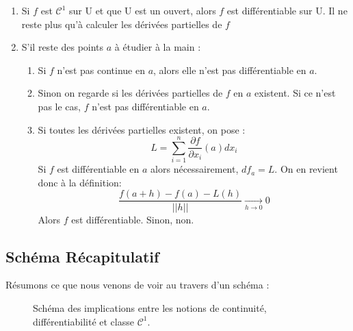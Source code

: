 \begin{enumerate}
    \item Si $f$ est $ \mathcal{C}^1$ sur U et que U est un ouvert, alors $f$ est différentiable sur U. Il ne reste plus qu'à calculer les dérivées partielles de $f$
    \item S'il reste des points $a$ à étudier à la main :
        \begin{enumerate}
            \item Si $f$ n'est pas continue en $a$, alors elle n'est pas différentiable en $a$.
            \item Sinon on regarde si les dérivées partielles de $f$ en $a$ existent. Si ce n'est pas le cas, $f$ n'est pas différentiable en $a$.
            \item Si toutes les dérivées partielles existent, on pose :
                    \[ L = \sum_{i=1}^{n} \frac{\partial f}{\partial x_i}(a)dx_i \]
                Si $f$ est différentiable en $a$ alors nécessairement, $df_a = L$. On en revient donc à la définition:
                            \[ \frac{f(a + h) - f(a) - L(h)}{ ||h|| } \underset{h \to 0}{\longrightarrow} 0 \]
                Alors $f$ est différentiable. Sinon, non.
        \end{enumerate}
\end{enumerate}

\subsection{Schéma Récapitulatif}

Résumons ce que nous venons de voir au travers d'un schéma : 

\begin{figure}[h!]
    \centering
    {
    }
    \caption{Schéma des implications entre les notions de continuité, différentiabilité et classe $\mathcal{C}^1$.}
    \label{fig:implications_diff}
\end{figure}


